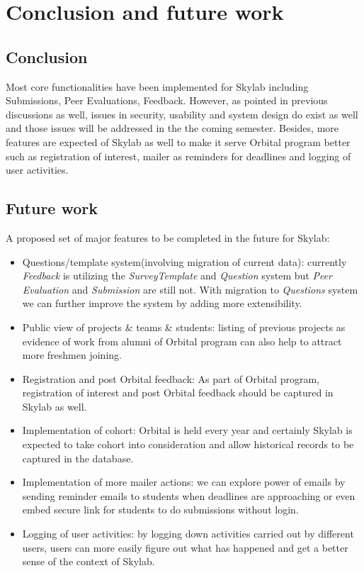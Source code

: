 \chapter{Conclusion and future work} \label{conclusionandfuturework}

\section{Conclusion}

Most core functionalities have been implemented for Skylab including Submissions, Peer Evaluations, Feedback. However, as pointed in previous discussions as well, issues in security, usability and system design do exist as well and those issues will be addressed in the the coming semester. Besides, more features are expected of Skylab as well to make it serve Orbital program better such as registration of interest, mailer as reminders for deadlines and logging of user activities.

\section{Future work}

A proposed set of major features to be completed in the future for Skylab:

\begin{itemize}
  \item Questions/template system(involving migration of current data): currently \textit{Feedback} is utilizing the \textit{SurveyTemplate} and \textit{Question} system but \textit{Peer Evaluation} and \textit{Submission} are still not. With migration to \textit{Questions} system we can further improve the system by adding more extensibility.
  \item Public view of projects \& teams \& students: listing of previous projects as evidence of work from alumni of Orbital program can also help to attract more freshmen joining.
  \item Registration and post Orbital feedback: As part of Orbital program, registration of interest and post Orbital feedback should be captured in Skylab as well.
  \item Implementation of cohort: Orbital is held every year and certainly Skylab is expected to take cohort into consideration and allow historical records to be captured in the database.
  \item Implementation of more mailer actions: we can explore power of emails by sending reminder emails to students when deadlines are approaching or even embed secure link for students to do submissions without login.
  \item Logging of user activities: by logging down activities carried out by different users, users can more easily figure out what has happened and get a better sense of the context of Skylab.
\end{itemize}


